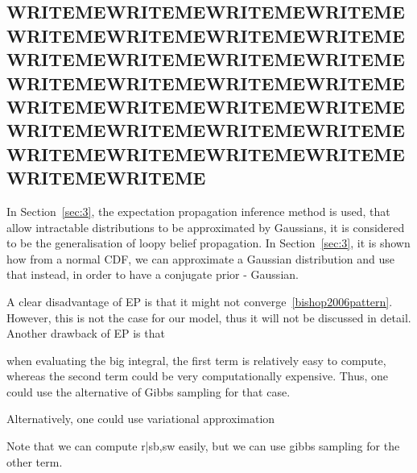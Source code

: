 \documentclass[a4paper,11pt]{article}
\theoremstyle{mytheor}
\begin{document}
\subsection{WRITEMEWRITEMEWRITEMEWRITEMEWRITEMEWRITEMEWRITEMEWRITEMEWRITEMEWRITEMEWRITEMEWRITEMEWRITEMEWRITEMEWRITEMEWRITEMEWRITEMEWRITEMEWRITEMEWRITEMEWRITEMEWRITEMEWRITEMEWRITEMEWRITEMEWRITEMEWRITEMEWRITEMEWRITEMEWRITEME}
In Section~\ref{sec:3}, the expectation propagation inference method is used, that allow intractable distributions to be approximated by Gaussians, it is considered to be the generalisation of loopy belief propagation. In Section~\ref{sec:3}, it is shown how from a normal CDF, we can approximate a Gaussian distribution and use that instead, in order to have a conjugate prior - Gaussian.

A clear disadvantage of EP is that it might not converge~\ref{bishop2006pattern}. However, this is not the case for our model, thus it will not be discussed in detail. Another drawback of EP is that

when evaluating the big integral, the first term is relatively easy to compute, whereas the second term could be very computationally expensive. Thus, one could use the alternative of Gibbs sampling for that case.

Alternatively, one could use variational approximation 

Note that we can compute r|sb,sw easily, but we can use gibbs sampling for the other term.

\clearpage



\clearpage
\end{document}
